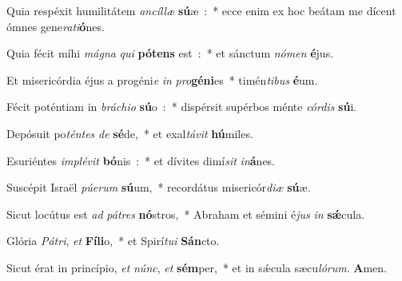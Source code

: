 ﻿\item Quia respéxit humilitátem \emph{an}\-\emph{cíl}\-\emph{læ} \textbf{sú}\-æ~:~* ecce enim ex hoc beátam me dícent ómnes gene\emph{ra}\emph{ti}\textbf{ó}nes.
\item Quia fécit míhi \emph{má}\-\emph{gna} \emph{qui} \textbf{pó}\-\textbf{tens} est~:~* et sánctum \emph{nó}\-\emph{men} \textbf{é}jus.
\item Et misericórdia éjus a progéni\emph{e} \emph{in} \emph{pro}\-\textbf{gé}\-\textbf{ni}\-es~* timén\emph{ti}\-\emph{bus} \textbf{é}um.
\item Fécit poténtiam in \emph{brá}\-\emph{chi}\-\emph{o} \textbf{sú}\-o~:~* dispérsit supérbos ménte \emph{cór}\-\emph{dis} \textbf{sú}i.
\item Depósuit po\emph{tén}\-\emph{tes} \emph{de} \textbf{sé}\-de,~* et exal\emph{tá}\-\emph{vit} \textbf{hú}miles.
\item Esuriéntes \emph{im}\-\emph{plé}\-\emph{vit} \textbf{bó}\-nis~:~* et dívites dimí\emph{sit} \emph{in}\textbf{á}nes.
\item Suscépit Israël \emph{pú}\-\emph{e}\-\emph{rum} \textbf{sú}\-um,~* recordátus misericór\emph{di}\-\emph{æ} \textbf{sú}æ.
\item Sicut locútus est \emph{ad} \emph{pá}\-\emph{tres} \textbf{nó}\-stros,~* Abraham et sémini é\emph{jus} \emph{in} \textbf{sǽ}cula.
\item Glória \emph{Pá}\-\emph{tri}, \emph{et} \textbf{Fí}\-\textbf{li}\-o,~* et Spirí\emph{tu}\-\emph{i} \textbf{Sán}cto.
\item Sicut érat in princípio, \emph{et} \emph{núnc}, \emph{et} \textbf{sém}\-per,~* et in sǽcula sæcu\emph{ló}\-\emph{rum}. \textbf{A}men.
